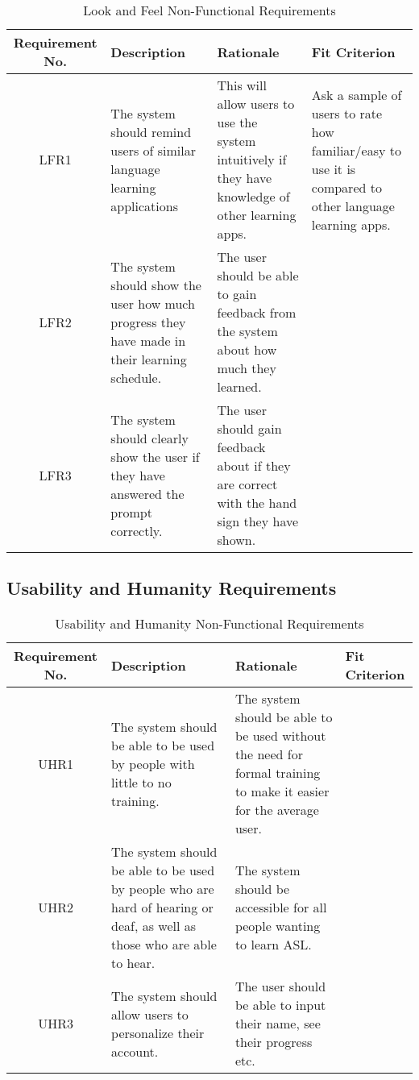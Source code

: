 \documentclass[12pt, titlepage]{article}
\begin{document}
\begin{table}[H]
\caption{Look and Feel Non-Functional Requirements}
\noindent \begin{tabular}{| c | p{3cm}| p{3cm}| p{3cm}|}
\toprule 
\textbf{Requirement No.} & \textbf{Description} & \textbf{Rationale} & \textbf{Fit Criterion}\\
\midrule
LFR1 & The system should remind users of similar language learning applications & This will allow users to use the system intuitively if they have knowledge of other learning apps. & Ask a sample of users to rate how familiar/easy to use it is compared to other language learning apps. \\
\hline
LFR2 & The system should show the user how much progress they have made in their learning schedule. & The user should be able to gain feedback from the system about how much they learned. & \\
\hline
LFR3 & The system should clearly show the user if they have answered the prompt correctly. & The user should gain feedback about if they are correct with the hand sign they have shown. & \\
\bottomrule
\end{tabular}
\end{table}

\subsection{Usability and Humanity Requirements}

\begin{table}[H]
\caption{Usability and Humanity Non-Functional Requirements}
\noindent \begin{tabular}{| c | p{3cm}| p{3cm}| p{3cm}|}
\toprule 
\textbf{Requirement No.} & \textbf{Description} & \textbf{Rationale} & \textbf{Fit Criterion}\\
\midrule
UHR1 & The system should be able to be used by people with little to no training. & The system should be able to be used without the need for formal training to make it easier for the average user. & \\
\hline
UHR2 & The system should be able to be used by people who are hard of hearing or deaf, as well as those who are able to hear. & The system should be accessible for all people wanting to learn ASL. & \\
\hline
UHR3 & The system should allow users to personalize their account. & The user should be able to input their name, see their progress etc. & \\
\bottomrule
\end{tabular}
\end{table}
\end{document}
